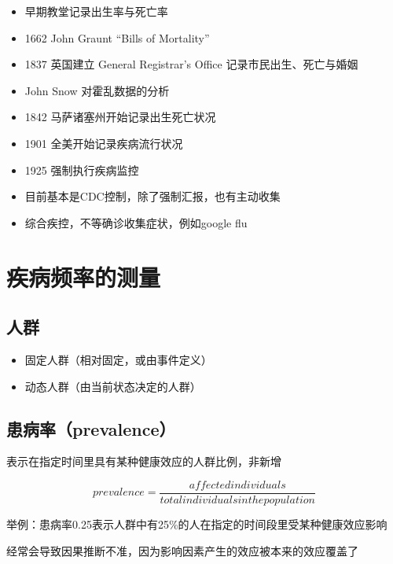 \documentclass[]{book}
\providecommand{\tightlist}{%
  \setlength{\itemsep}{0pt}\setlength{\parskip}{0pt}}
\begin{document}
\begin{itemize}
\tightlist
\item
  早期教堂记录出生率与死亡率
\item
  1662 John Graunt ``Bills of Mortality''
\item
  1837 英国建立 General Registrar's Office 记录市民出生、死亡与婚姻
\item
  John Snow 对霍乱数据的分析
\item
  1842 马萨诸塞州开始记录出生死亡状况
\item
  1901 全美开始记录疾病流行状况
\item
  1925 强制执行疾病监控
\item
  目前基本是CDC控制，除了强制汇报，也有主动收集
\item
  综合疾控，不等确诊收集症状，例如google flu
\end{itemize}

\hypertarget{ux75beux75c5ux9891ux7387ux7684ux6d4bux91cf}{%
\section{疾病频率的测量}\label{ux75beux75c5ux9891ux7387ux7684ux6d4bux91cf}}

\hypertarget{ux4ebaux7fa4}{%
\subsection{人群}\label{ux4ebaux7fa4}}

\begin{itemize}
\tightlist
\item
  固定人群（相对固定，或由事件定义）
\item
  动态人群（由当前状态决定的人群）
\end{itemize}

\hypertarget{ux60a3ux75c5ux7387prevalence}{%
\subsection{患病率（prevalence）}\label{ux60a3ux75c5ux7387prevalence}}

表示在指定时间里具有某种健康效应的人群比例，非新增

\[prevalence = \frac{affected individuals}{total individuals in the population}\]

举例：患病率0.25表示人群中有25\%的人在指定的时间段里受某种健康效应影响

经常会导致因果推断不准，因为影响因素产生的效应被本来的效应覆盖了
\end{document}
